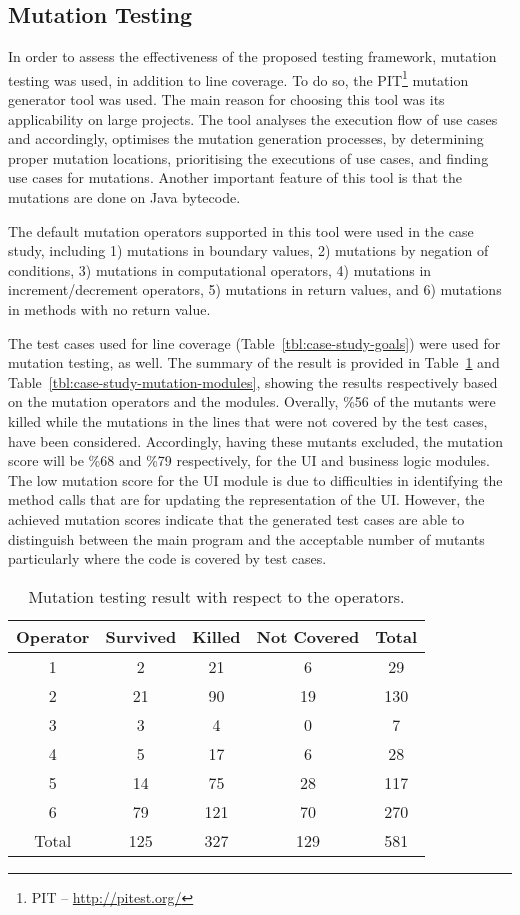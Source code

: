 \subsection{Mutation Testing}
\label{sec:case-study-mutation}
In order to assess the effectiveness of the proposed testing framework, mutation testing was used, in addition to line coverage. To do so, the PIT\footnote{PIT – \url{http://pitest.org/}} mutation generator tool was used. The main reason for choosing this tool was its applicability on large projects. The tool analyses the execution flow of use cases and accordingly, optimises the mutation generation processes, by determining proper mutation locations, prioritising the executions of use cases, and finding use cases for mutations. Another important feature of this tool is that the mutations are done on Java bytecode.

The default mutation operators supported in this tool were used in the case study, including 1) mutations in boundary values, 2) mutations by negation of conditions, 3) mutations in computational operators, 4) mutations in increment/decrement operators, 5) mutations in return values, and 6) mutations in methods with no return value.

The test cases used for line coverage (Table~\ref{tbl:case-study-goals}) were used for mutation testing, as well. The summary of the result is provided in Table~\ref{tbl:case-study-mutation-operators} and Table~\ref{tbl:case-study-mutation-modules}, showing the results respectively based on the mutation operators and the modules. Overally, \%56 of the mutants were killed while the mutations in the lines that were not covered by the test cases, have been considered. Accordingly, having these mutants excluded, the mutation score will be \%68 and \%79 respectively, for the UI and business logic modules. The low mutation score for the UI module is due to difficulties in identifying the method calls that are for updating the representation of the UI. 
However, the achieved mutation scores indicate that the generated test cases are able to distinguish between the main program and the acceptable number of mutants particularly where the code is covered by test cases.

\begin{table}[!t]
\caption{Mutation testing result with respect to the operators.}
\label{tbl:case-study-mutation-operators}
\centering
\begin{tabular}{|c|c|c|c|c|}
\hline
Operator & Survived & Killed & Not Covered & Total \\ \hline
1 & 2 & 21 & 6 & 29 \\ \hline
2 & 21 & 90 & 19 & 130  \\ \hline
3 & 3 & 4 & 0 & 7 \\ \hline
4 & 5 & 17 & 6 & 28 \\ \hline
5 & 14 & 75 & 28 & 117 \\ \hline
6 & 79 & 121 & 70 & 270 \\ \hline\hline
Total & 125 & 327 & 129 & 581 \\
\hline
\end{tabular}
\end{table}

